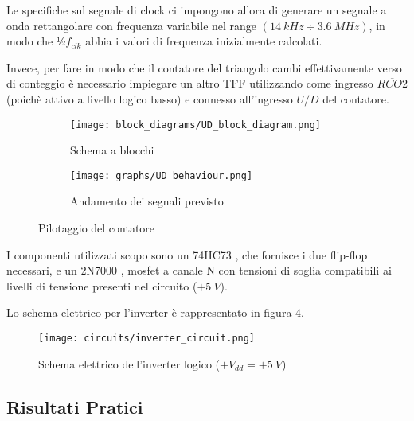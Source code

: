 Le specifiche sul segnale di clock ci impongono allora di generare un segnale a onda rettangolare
con frequenza variabile nel range $(14\ kHz\div3.6\ MHz)$, in modo che ½$f_{clk}$ abbia
i valori di frequenza inizialmente calcolati.

Invece, per fare in modo che il contatore del triangolo cambi effettivamente verso di conteggio
è necessario impiegare un altro TFF utilizzando come ingresso $\overline{RCO2}$ (poichè
attivo a livello logico basso) e connesso all'ingresso $U/D$ del contatore.

\begin{figure}[H]
    \centering

    \begin{subfigure}{.5\textwidth}
        \centering
        \texttt{[image: block\_diagrams/UD\_block\_diagram.png]}
        \caption{Schema a blocchi}
        \label{UD_block_diagram}
    \end{subfigure}%
    \begin{subfigure}{.5\textwidth}
        \centering
        \texttt{[image: graphs/UD\_behaviour.png]}
        \caption{Andamento dei segnali previsto}
        \label{UD_behaviour}
    \end{subfigure}

    \caption{Pilotaggio del contatore}
\end{figure}

I componenti utilizzati scopo sono un 74HC73 \cite{74hc73}, che fornisce i due flip-flop
necessari, e un 2N7000 \cite{2n7000}, mosfet a canale N con tensioni di soglia compatibili
ai livelli di tensione presenti nel circuito ($+5\ V$).

Lo schema elettrico per l'inverter è rappresentato in figura \ref{inverter_circuit}.

\begin{figure}[H]
    \centering
    \texttt{[image: circuits/inverter\_circuit.png]}
    \caption{Schema elettrico dell'inverter logico ($+V_{dd}=+5\ V$)}
    \label{inverter_circuit}
\end{figure}


\subsection*{Risultati Pratici}


